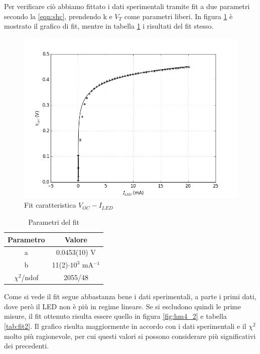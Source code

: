 \documentclass[journal, a4paper]{IEEEtran}
\begin{document}
Per verificare ciò abbiamo fittato i dati sperimentali tramite fit a due parametri secondo la \ref{eqn:shc}, prendendo k e $V_T$ come parametri liberi. In figura \ref{fig:hm4} è mostrato il grafico di fit, mentre in tabella \ref{tab:fithm4} i risultati del fit stesso. 

\begin{figure}[htp]
\centering
\includegraphics[scale=.4]{hm4}
\caption{Fit caratteristica $V_{OC}-I_{LED}$}
\label{fig:hm4}
\end{figure}

\begin{table}[htp]
\centering
\caption{Parametri del fit}
\label{tab:fithm4}
\begin{tabular}{|c|c|}
\hline 
Parametro & Valore \\ 
\hline 
a & 0.0453(10) V \\ 
\hline 
b & 11(2)$\cdot 10^3$ mA$^{-1}$ \\ 
\hline 
$\chi^2$/ndof & 2055/48 \\ 
\hline 
\end{tabular} 
\end{table}

Come si vede il fit segue abbastanza bene i dati sperimentali, a parte i primi dati, dove però il LED non è più in regime lineare. Se si escludono quindi le prime misure, il fit ottenuto risulta essere quello in figura \ref{fig:hm4_2} e tabella \ref{tab:fit2}. Il grafico risulta maggiormente in accordo con i dati sperimentali e il $\chi^2$ molto più ragionevole, per cui questi valori si possono considerare più significativi dei precedenti.
\end{document}
